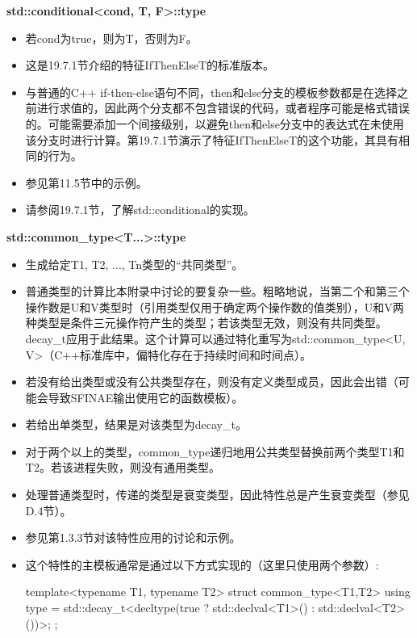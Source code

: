 \textbf{std::conditional<cond, T, F>::type}

\begin{itemize}
\item
若cond为true，则为T，否则为F。

\item
这是19.7.1节介绍的特征IfThenElseT的标准版本。

\item
与普通的C++ if-then-else语句不同，then和else分支的模板参数都是在选择之前进行求值的，因此两个分支都不包含错误的代码，或者程序可能是格式错误的。可能需要添加一个间接级别，以避免then和else分支中的表达式在未使用该分支时进行计算。第19.7.1节演示了特征IfThenElseT的这个功能，其具有相同的行为。

\item
参见第11.5节中的示例。

\item
请参阅19.7.1节，了解std::conditional的实现。
\end{itemize}

\textbf{std::common\_type<T...>::type}

\begin{itemize}
\item
生成给定T1, T2, ..., Tn类型的“共同类型”。

\item
普通类型的计算比本附录中讨论的要复杂一些。粗略地说，当第二个和第三个操作数是U和V类型时（引用类型仅用于确定两个操作数的值类别），U和V两种类型是条件三元操作符产生的类型；若该类型无效，则没有共同类型。decay\_t应用于此结果。这个计算可以通过特化重写为std::common\_type<U, V>（C++标准库中，偏特化存在于持续时间和时间点）。

\item
若没有给出类型或没有公共类型存在，则没有定义类型成员，因此会出错（可能会导致SFINAE输出使用它的函数模板）。

\item
若给出单类型，结果是对该类型为decay\_t。

\item
对于两个以上的类型，common\_type递归地用公共类型替换前两个类型T1和T2。若该进程失败，则没有通用类型。

\item
处理普通类型时，传递的类型是衰变类型，因此特性总是产生衰变类型（参见D.4节）。

\item
参见第1.3.3节对该特性应用的讨论和示例。

\item
这个特性的主模板通常是通过以下方式实现的（这里只使用两个参数）:

\begin{cpp}
template<typename T1, typename T2>
struct common_type<T1,T2> {
	using type = std::decay_t<decltype(true ? std::declval<T1>()
	: std::declval<T2>())>;
};
\end{cpp}
\end{itemize}

